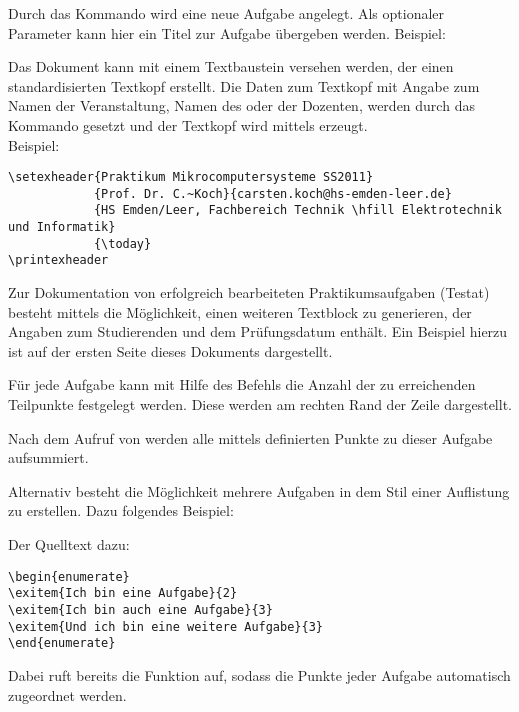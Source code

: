 \documentclass[a4paper,12pt]{article}
\begin{document}

Durch das Kommando \tsetprog{\exercise}wird eine neue Aufgabe angelegt. Als optionaler Parameter kann hier ein Titel zur Aufgabe übergeben werden. Beispiel:



%
Das Dokument kann mit einem Textbaustein versehen werden, der einen standardisierten Textkopf erstellt. Die Daten zum Textkopf mit Angabe zum Namen der Veranstaltung, Namen des oder der Dozenten, werden durch das Kommando \tsetprog{\setexheader}gesetzt und der Textkopf wird mittels \tsetprog{\printexheader}erzeugt.\\ Beispiel: 

\begin{verbatim}
\setexheader{Praktikum Mikrocomputersysteme SS2011}
			{Prof. Dr. C.~Koch}{carsten.koch@hs-emden-leer.de}
			{HS Emden/Leer, Fachbereich Technik \hfill Elektrotechnik und Informatik}
			{\today}	
\printexheader
\end{verbatim}
			
Zur Dokumentation von erfolgreich bearbeiteten Praktikumsaufgaben (Testat) besteht mittels \tsetprog{\printreceipt}die Möglichkeit, einen weiteren Textblock zu generieren, der Angaben zum Studierenden und dem Prüfungsdatum enthält. Ein Beispiel hierzu ist auf der ersten Seite dieses Dokuments dargestellt. 

Für jede Aufgabe kann mit Hilfe des Befehls \tsetprog{\addpoints}die Anzahl der zu erreichenden Teilpunkte festgelegt werden. Diese werden am rechten Rand der Zeile dargestellt. 

Nach dem Aufruf von \tsetprog{\exercise}werden alle mittels \tsetprog{\addpoints}definierten Punkte zu dieser Aufgabe aufsummiert. 

Alternativ besteht die Möglichkeit mehrere Aufgaben in dem Stil einer Auflistung zu erstellen. Dazu folgendes Beispiel:

\begin{enumerate}
\end{enumerate}
Der Quelltext dazu:
\begin{verbatim}
\begin{enumerate}
\exitem{Ich bin eine Aufgabe}{2}
\exitem{Ich bin auch eine Aufgabe}{3}
\exitem{Und ich bin eine weitere Aufgabe}{3}
\end{enumerate}
\end{verbatim}
Dabei ruft \tsetprog{\exitem}bereits die Funktion \tsetprog{\addpoints}auf, sodass die Punkte jeder Aufgabe automatisch zugeordnet werden.
\end{document}
